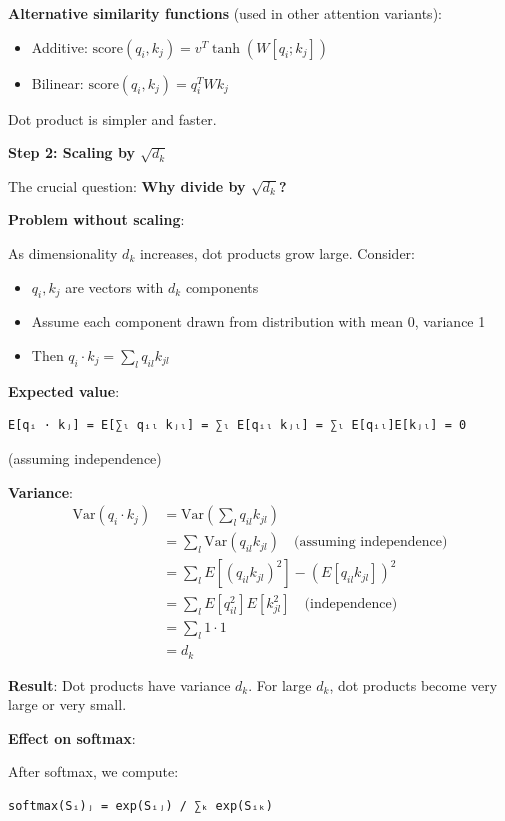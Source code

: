 \documentclass[11pt,oneside]{book}
\begin{document}
\textbf{Alternative similarity functions} (used in other attention variants):
\begin{itemize}
\item Additive: $\text{score}(q_i, k_j) = v^T \tanh(W[q_i; k_j])$
\item Bilinear: $\text{score}(q_i, k_j) = q_i^T W k_j$
\end{itemize}

Dot product is simpler and faster.

\textbf{Step 2: Scaling by $\sqrt{d_k}$}

The crucial question: \textbf{Why divide by $\sqrt{d_k}$?}

\textbf{Problem without scaling}:

As dimensionality $d_k$ increases, dot products grow large. Consider:
\begin{itemize}
\item $q_i, k_j$ are vectors with $d_k$ components
\item Assume each component drawn from distribution with mean 0, variance 1
\item Then $q_i \cdot k_j = \sum_l q_{il} k_{jl}$
\end{itemize}

\textbf{Expected value}:
\begin{verbatim}
E[qᵢ · kⱼ] = E[∑ₗ qᵢₗ kⱼₗ] = ∑ₗ E[qᵢₗ kⱼₗ] = ∑ₗ E[qᵢₗ]E[kⱼₗ] = 0
\end{verbatim}
(assuming independence)

\textbf{Variance}:
\begin{align*}
\text{Var}(q_i \cdot k_j) &= \text{Var}\left(\sum_l q_{il} k_{jl}\right) \\
             &= \sum_l \text{Var}(q_{il} k_{jl})  \quad \text{(assuming independence)} \\
             &= \sum_l E[(q_{il} k_{jl})^2] - (E[q_{il} k_{jl}])^2 \\
             &= \sum_l E[q_{il}^2]E[k_{jl}^2]  \quad \text{(independence)} \\
             &= \sum_l 1 \cdot 1 \\
             &= d_k
\end{align*}

\textbf{Result}: Dot products have variance $d_k$. For large $d_k$, dot products become very large or very small.

\textbf{Effect on softmax}:

After softmax, we compute:
\begin{verbatim}
softmax(Sᵢ)ⱼ = exp(Sᵢⱼ) / ∑ₖ exp(Sᵢₖ)
\end{verbatim}
\end{document}
